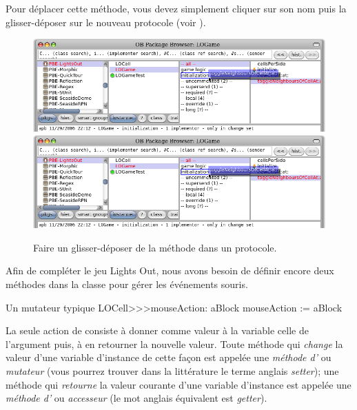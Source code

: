 \documentclass[a4paper,10pt,twoside]{book}
\begin{document}
Pour déplacer cette méthode, vous devez simplement cliquer sur son nom
puis la glisser-déposer sur le nouveau protocole (voir ).

\begin{figure}[htbp]
   \centering
   \ifluluelse
		{\includegraphics[width=\textwidth]{DragMethod} }
		{\includegraphics[scale=0.7]{DragMethod} }
   \caption{Faire un glisser-déposer de la méthode dans un protocole.}
\end{figure}

Afin de compléter le jeu Lights Out, nous avons besoin de définir encore deux méthodes dans la classe  pour gérer les événements souris.
\begin{method}[mouseAction:]{Un mutateur typique}
LOCell>>>mouseAction: aBlock
   mouseAction := aBlock
\end{method}

La seule action de  consiste à donner comme
valeur à la variable  celle de l'argument puis, à en
retourner la nouvelle valeur. Toute méthode qui \emph{change} la
valeur d'une variable d'instance de cette façon est appelée une
\emph{méthode d'}
ou \emph{mutateur} (vous pourrez
trouver dans la littérature le terme anglais \emph{setter}); une
méthode qui \emph{retourne} la valeur courante d'une variable
d'instance est appelée une \emph{méthode d'} ou
\emph{accesseur} (le mot anglais équivalent est \emph{getter}).
\end{document}
